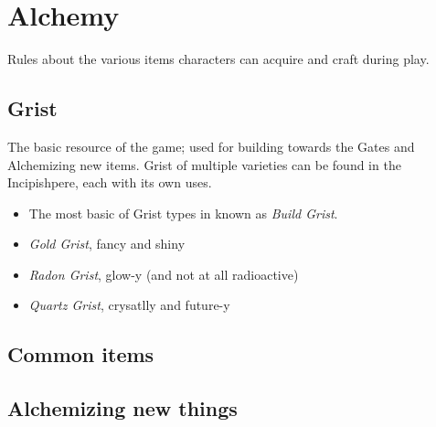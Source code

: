 \chapter{Alchemy}

Rules about the various items characters can acquire and craft during play.

\section{Grist}

The basic resource of the game; used for building towards the Gates and Alchemizing new items.
Grist of multiple varieties can be found in the Incipishpere, each with its own uses.
\begin{itemize}
	\item The most basic of Grist types in known as \emph{Build Grist}.
	\item \emph {Gold Grist}, fancy and shiny
	\item \emph {Radon Grist}, glow-y (and not at all radioactive)
	\item \emph {Quartz Grist}, crysatlly and future-y
\end{itemize}

\section{Common items}

\section{Alchemizing new things}
